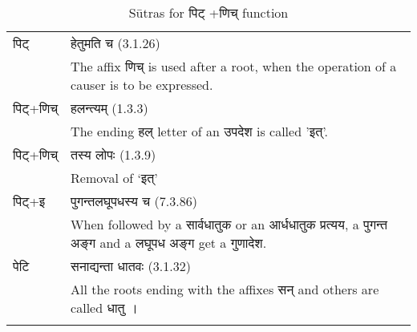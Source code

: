 		\begin{longtable}{ |p{1.6cm}|p{14.4cm}| } 
			\hline
			
			\rowcolor{red!10}
			\texthindi{पिट्}
			&	
			\texthindi{हेतुमति च} (3.1.26) \\
			\rowcolor{red!10}
			&The affix \texthindi{णिच्} is used after a root, when the operation of a causer is to be expressed.
			\\\hline
			\rowcolor{blue!10}
			\texthindi{पिट्}+\texthindi{णिच्}
			&\texthindi{हलन्त्यम्} (1.3.3)\\
			\rowcolor{blue!10}
			&The ending \texthindi{हल्} letter of an \texthindi{उपदेश} is called '\texthindi{इत्}'.
			\\
			\hline
			\rowcolor{blue!10}
			\texthindi{पिट्}+\texthindi{णिच्}
			&\texthindi{तस्य लोपः} (1.3.9)\\
			\rowcolor{blue!10}
			&Removal of ‘\texthindi{इत्}’
			\\
			\hline
			\rowcolor{green!10}
			\texthindi{पिट्}+\texthindi{इ}
			&\texthindi{पुगन्तलघूपधस्य च} (7.3.86) \\
			\rowcolor{green!10}
			&When followed by a \texthindi{सार्वधातुक} or an \texthindi{आर्धधातुक प्रत्यय}, a \texthindi{पुगन्त अङ्ग} and a \texthindi{लघूपध अङ्ग} get a \texthindi{गुणादेश}.
			\\\hline
			\rowcolor{yellow!10}
			\texthindi{पेटि}
			&\texthindi{सनाद्यन्ता धातवः} (3.1.32) \\
			\rowcolor{yellow!10}
			&All the roots ending with the affixes \texthindi{सन्} and others are called \texthindi{धातु} । 
			\\\hline
		
		\caption{Sūtras for \texthindi{पिट् +णिच्} function}
		\label{table:a4}
		\end{longtable}


